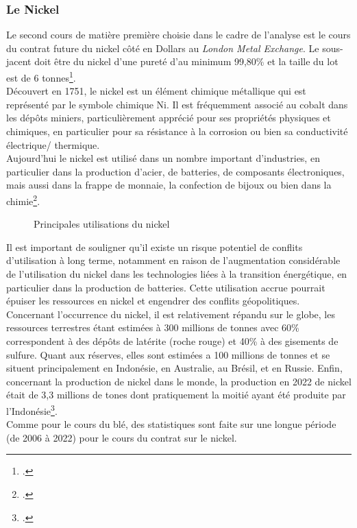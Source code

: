 \subsubsection{Le Nickel}
Le second cours de matière première choisie dans le cadre de l'analyse est le cours du contrat future du nickel côté en Dollars au \textit{London Metal Exchange}. Le 
sous-jacent doit être du nickel d'une pureté d'au minimum 99,80\% et la taille du lot est de 6 tonnes\footcite{lme_nickel}.\\[11pt]
Découvert en 1751, le nickel est un élément chimique métallique qui est représenté par le symbole chimique Ni. Il est fréquemment associé au cobalt dans les dépôts 
miniers, particulièrement apprécié pour ses propriétés physiques et chimiques, en particulier pour sa résistance à la corrosion ou bien sa conductivité électrique/
thermique. \\[11pt]
Aujourd'hui le nickel est utilisé dans un nombre important d'industries, en particulier dans la production  
d'acier, de batteries, de composants électroniques, mais aussi dans la frappe de monnaie, la confection de bijoux ou bien dans la chimie\footcite{about_nickel}.
\begin{figure}[H]
    \centering
    \resizebox{0.8\textwidth}{!}{}
    \caption{Principales utilisations du nickel}
\end{figure}
Il est important de souligner qu'il existe un risque potentiel de conflits d'utilisation à long terme, notamment en raison de l'augmentation considérable de l'utilisation 
du nickel dans les technologies liées à la transition énergétique, en particulier dans la production de batteries. Cette utilisation accrue pourrait épuiser les ressources 
en nickel et engendrer des conflits géopolitiques.\\[11pt]
Concernant l'occurrence du nickel, il est relativement répandu sur le globe, les ressources terrestres étant estimées à 300 millions de tonnes avec 60\% correspondent à 
des dépôts de latérite (roche rouge) et 40\% à des gisements de sulfure. Quant aux réserves, elles sont estimées a 100 millions de tonnes et se 
situent principalement en Indonésie, en Australie, au Brésil, et en Russie. Enfin, concernant la production de nickel dans le monde, la production en 2022 de nickel était
de 3,3 millions de tones dont pratiquement la moitié ayant été produite par l'Indonésie\footcite{info_nickel}.\\[11pt]
Comme pour le cours du blé, des statistiques sont faite sur une longue période (de 2006 à 2022) pour le cours du contrat sur le nickel.
